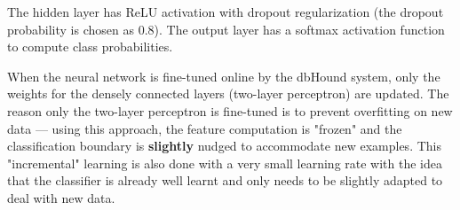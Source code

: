 The hidden layer has ReLU activation with dropout regularization (the dropout probability is chosen as 0.8).
 The output layer has a softmax activation function to compute class probabilities.


When the neural network is fine-tuned online by the dbHound system, only the weights for the densely connected layers (two-layer perceptron) are updated.
 The reason only the two-layer perceptron is fine-tuned is to prevent overfitting on new data --- using this approach, the feature computation is "frozen" and the classification boundary is \textbf{slightly} nudged to accommodate new examples.
 This "incremental" learning is also done with a very small learning rate with the idea that the classifier is already well learnt and only needs to be slightly adapted to deal with new data.


